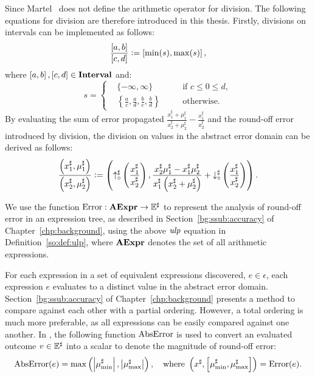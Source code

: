 Since Martel~\cite{martel07} does not define the arithmetic operator for
division.  The following equations for division are therefore introduced in
this thesis.  Firstly, divisions on intervals can be implemented as follows:
\begin{equation}
    \frac{\left[{a}, {b}\right]}{\left[{c}, {d}\right]}
        \vcentcolon= \left[{\min(s)}, {\max(s)}\right],
\end{equation}
where $\left[{a}, {b}\right], \left[{c}, {d}\right] \in \mathbf{Interval}$ and:
\begin{equation}
    s = \left\{
    \begin{aligned}
        & \{ -\infty, \infty \}
            && \text{if~} c \leq 0 \leq d, \\
        & \left\{
            \frac{a}{c}, \frac{a}{d}, \frac{b}{c}, \frac{b}{d}
        \right\}
            \quad && \text{otherwise}.
    \end{aligned}
    \right.
\end{equation}
By evaluating the sum of error propagated $\frac{ x^\sharp_1 + \mu^\sharp_1 }{
x^\sharp_2 + \mu^\sharp_2 } - \frac{x^\sharp_1}{x^\sharp_2}$ and the round-off
error introduced by division, the division on values in the abstract error
domain can be derived as follows:
\begin{equation}
    \frac{
        \left( x^\sharp_1, \mu^\sharp_1 \right)
    }{
        \left( x^\sharp_2, \mu^\sharp_2 \right)
    }
    \vcentcolon= \left(
            \operatorname{\uparrow^\sharp_\circ}\left(\frac{x^\sharp_1}{x^\sharp_2}\right),
            \frac{
                x^\sharp_2 \mu^\sharp_1 - x^\sharp_1 \mu^\sharp_2
            }{
                x^\sharp_1 \left( x^\sharp_2 + \mu^\sharp_2 \right)
            } + \operatorname{\downarrow^\sharp_\circ}\left(\frac{x^\sharp_1}{x^\sharp_2}\right)
        \right).
\end{equation}

We use the function $\operatorname{\mathrm{Error}}: \mathbf{AExpr}\to\mathbb{E}^\sharp$ to represent the
analysis of round-off error in an expression tree, as described in
Section~\ref{bg:ssub:accuracy} of Chapter~\ref{chp:background}, using the above
$\operatorname{\mathit{ulp}}$ equation in Definition~\ref{so:def:ulp}, where $\mathbf{AExpr}$ denotes the
set of all arithmetic expressions.

For each expression in a set of equivalent expressions discovered, $e \in
\epsilon$, each expression $e$ evaluates to a distinct value in the abstract
error domain.  Section~\ref{bg:ssub:accuracy} of Chapter~\ref{chp:background}
presents a method to compare against each other with a partial ordering.
However, a total ordering is much more preferable, as all expressions can
be easily compared against one another.  In \soap, the following function
$\operatorname{\mathrm{AbsError}}$ is used to convert an evaluated outcome $v \in \mathbb{E}^\sharp$ into a
scalar to denote the magnitude of round-off error:
\begin{equation}
    \operatorname{\mathrm{AbsError}}(e) = \max\left(
        \left| \mu^\sharp_{\min} \right|,
        \left| \mu^\sharp_{\max} \right|
    \right),
    \quad \text{where~}
    \left(
        x^\sharp, \left[ \mu^\sharp_{\min}, \mu^\sharp_{\max} \right]
    \right) = \operatorname{\mathrm{Error}}(e).
    \label{so:eq:abserr}
\end{equation}
